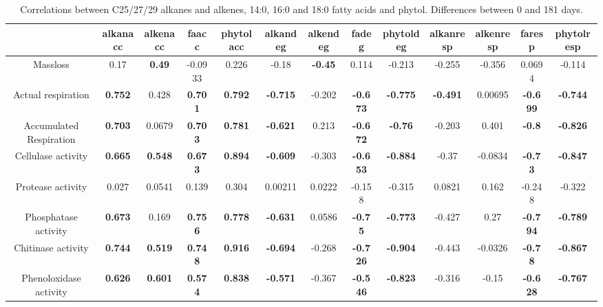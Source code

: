 \documentclass[authoryear,preprint,review,12pt]{elsarticle}
\begin{document}
\begin{landscape}
\begin{table}[h!]
\begin{center}
\caption{Correlations between C25/27/29 alkanes and alkenes, 14:0, 16:0 and 18:0 fatty acids and phytol. Differences between 0 and 181 days.}
\label{corrtable_notlig}
{\tiny
\begin{tabular}{ccccccccccccc}
  \hline
 & alkanacc & alkenacc & faacc & phytolacc & alkandeg & alkendeg & fadeg & phytoldeg & alkanresp & alkenresp & faresp & phytolresp \\ 
  \hline
Massloss & 0.17 & \textbf{ 0.49 } & -0.0933 & 0.226 & -0.18 & \textbf{ -0.45 } & 0.114 & -0.213 & -0.255 & -0.356 & 0.0694 & -0.114 \\ 
  Actual respiration & \textbf{ 0.752 } & 0.428 & \textbf{ 0.701 } & \textbf{ 0.792 } & \textbf{ -0.715 } & -0.202 & \textbf{ -0.673 } & \textbf{ -0.775 } & \textbf{ -0.491 } & 0.00695 & \textbf{ -0.699 } & \textbf{ -0.744 } \\ 
  Accumulated Respiration & \textbf{ 0.703 } & 0.0679 & \textbf{ 0.703 } & \textbf{ 0.781 } & \textbf{ -0.621 } & 0.213 & \textbf{ -0.672 } & \textbf{ -0.76 } & -0.203 & 0.401 & \textbf{ -0.8 } & \textbf{ -0.826 } \\ 
  Cellulase activity & \textbf{ 0.665 } & \textbf{ 0.548 } & \textbf{ 0.673 } & \textbf{ 0.894 } & \textbf{ -0.609 } & -0.303 & \textbf{ -0.653 } & \textbf{ -0.884 } & -0.37 & -0.0834 & \textbf{ -0.73 } & \textbf{ -0.847 } \\ 
  Protease activity & 0.027 & 0.0541 & 0.139 & 0.304 & 0.00211 & 0.0222 & -0.158 & -0.315 & 0.0821 & 0.162 & -0.248 & -0.322 \\ 
  Phosphatase activity & \textbf{ 0.673 } & 0.169 & \textbf{ 0.756 } & \textbf{ 0.778 } & \textbf{ -0.631 } & 0.0586 & \textbf{ -0.75 } & \textbf{ -0.773 } & -0.427 & 0.27 & \textbf{ -0.794 } & \textbf{ -0.789 } \\ 
  Chitinase activity & \textbf{ 0.744 } & \textbf{ 0.519 } & \textbf{ 0.748 } & \textbf{ 0.916 } & \textbf{ -0.694 } & -0.268 & \textbf{ -0.726 } & \textbf{ -0.904 } & -0.443 & -0.0326 & \textbf{ -0.78 } & \textbf{ -0.867 } \\ 
  Phenoloxidase activity & \textbf{ 0.626 } & \textbf{ 0.601 } & \textbf{ 0.574 } & \textbf{ 0.838 } & \textbf{ -0.571 } & -0.367 & \textbf{ -0.546 } & \textbf{ -0.823 } & -0.316 & -0.15 & \textbf{ -0.628 } & \textbf{ -0.767 } \\ 

\end{tabular}}
\end{center}
\end{table}
\end{landscape}
\end{document}
